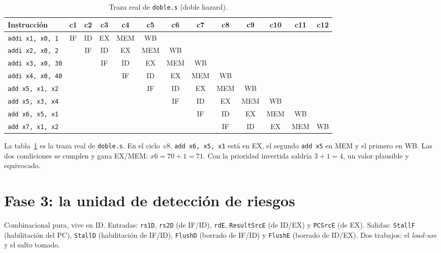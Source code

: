\documentclass[11pt,letterpaper]{article}
\newcommand{\cod}[1]{\texttt{#1}}
\begin{document}
\begin{table}[!htbp]
\centering\scriptsize
\setlength{\tabcolsep}{2.2pt}
\begin{tabular}{@{}lcccccccccccc@{}}
\toprule
\textbf{Instrucci\'on} & \textbf{c1} & \textbf{c2} & \textbf{c3} & \textbf{c4} & \textbf{c5} & \textbf{c6} & \textbf{c7} & \textbf{c8} & \textbf{c9} & \textbf{c10} & \textbf{c11} & \textbf{c12} \\
\midrule
\texttt{addi x1, x0, 1} & IF & ID & EX & MEM & WB &  &  &  &  &  &  &  \\
\texttt{addi x2, x0, 2} &  & IF & ID & EX & MEM & WB &  &  &  &  &  &  \\
\texttt{addi x3, x0, 30} &  &  & IF & ID & EX & MEM & WB &  &  &  &  &  \\
\texttt{addi x4, x0, 40} &  &  &  & IF & ID & EX & MEM & WB &  &  &  &  \\
\texttt{add x5, x1, x2} &  &  &  &  & IF & ID & EX & MEM & WB &  &  &  \\
\texttt{add x5, x3, x4} &  &  &  &  &  & IF & ID & EX & MEM & WB &  &  \\
\texttt{add x6, x5, x1} &  &  &  &  &  &  & IF & ID & EX & MEM & WB &  \\
\texttt{add x7, x1, x2} &  &  &  &  &  &  &  & IF & ID & EX & MEM & WB \\
\bottomrule
\end{tabular}
\caption{Traza real de \cod{doble.s} (doble hazard).}
\label{tab:traza_doble}
\end{table}

La tabla~\ref{tab:traza_doble} es la traza real de \cod{doble.s}. En el ciclo~c8, \cod{add x6, x5, x1}
est\'a en EX, el segundo \cod{add x5} en MEM y el primero en WB. Las dos condiciones se cumplen y gana
EX/MEM: $\mathit{x6} = 70 + 1 = 71$. Con la prioridad invertida saldr\'ia $3 + 1 = 4$, un valor
plausible y equivocado.

\section{Fase 3: la unidad de detecci\'on de riesgos}
\begin{enunciado}
Combinacional pura, vive en ID. Entradas: \cod{rs1D}, \cod{rs2D} (de IF/ID), \cod{rdE},
\cod{ResultSrcE} (de ID/EX) y \cod{PCSrcE} (de EX). Salidas: \cod{StallF} (habilitaci\'on del PC),
\cod{StallD} (habilitaci\'on de IF/ID), \cod{FlushD} (borrado de IF/ID) y \cod{FlushE} (borrado de
ID/EX). Dos trabajos: el \emph{load-use} y el salto tomado.
\end{enunciado}
\end{document}
